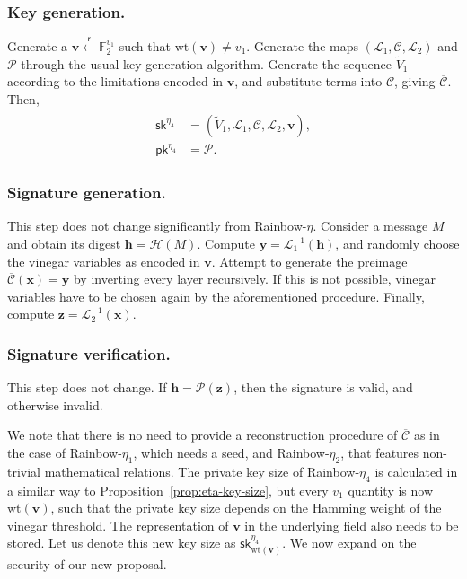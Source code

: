 \documentclass[12pt, a4paper, oneside]{memoir}
\newcommand{\random}{\overset{\mathsf{r}}{\gets}}
\theoremstyle{definition}
\begin{document}
\subsubsection{Key generation.}

Generate a $\mathbf{v} \random{} \mathbb{F}_{2}^{v_{1}}$ such that $\text{wt}(\mathbf{v}) \neq v_{1}$. Generate the maps $(\mathcal{L}_{1}, \mathcal{C}, \mathcal{L}_{2})$ and $\mathcal{P}$ through the usual key generation algorithm. Generate the sequence $\widetilde{V}_{1}$ according to the limitations encoded in $\mathbf{v}$, and substitute terms into $\mathcal{C}$, giving $\overline{\mathcal{C}}$. Then,
\begin{align}
  \begin{split}
    \mathsf{sk}^{\eta_{4}} &= (\widetilde{V}_{1}, \mathcal{L}_{1}, \overline{\mathcal{C}}, \mathcal{L}_{2}, \mathbf{v}), \\
    \mathsf{pk}^{\eta_{4}} &= \mathcal{P}.
  \end{split}
\end{align}

\subsubsection{Signature generation.}

This step does not change significantly from Rainbow-$\eta$. Consider a message $M$ and obtain its digest $\mathbf{h} = \mathcal{H}(M)$. Compute $\mathbf{y} = \mathcal{L}_{1}^{-1}(\mathbf{h})$, and randomly choose the vinegar variables as encoded in $\mathbf{v}$. Attempt to generate the preimage $\overline{\mathcal{C}}(\mathbf{x}) = \mathbf{y}$ by inverting every layer recursively. If this is not possible, vinegar variables have to be chosen again by the aforementioned procedure. Finally, compute $\mathbf{z} = \mathcal{L}_{2}^{-1}(\mathbf{x})$.

\subsubsection{Signature verification.}

This step does not change. If $\mathbf{h} = \mathcal{P}(\mathbf{z})$, then the signature is valid, and otherwise invalid.

We note that there is no need to provide a reconstruction procedure of $\overline{\mathcal{C}}$ as in the case of Rainbow-$\eta_{1}$, which needs a seed, and Rainbow-$\eta_{2}$, that features non-trivial mathematical relations. The private key size of Rainbow-$\eta_{4}$ is calculated in a similar way to Proposition~\ref{prop:eta-key-size}, but every $v_{1}$ quantity is now $\text{wt}(\mathbf{v})$, such that the private key size depends on the Hamming weight of the vinegar threshold. The representation of $\mathbf{v}$ in the underlying field also needs to be stored. Let us denote this new key size as $\textsf{sk}^{\eta_{4}}_{\text{wt}(\mathbf{v})}$. We now expand on the security of our new proposal.
\end{document}
